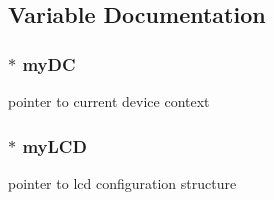 \subsection{Variable Documentation}
\hypertarget{group__ap7000__lcd_gba0cd39ac57537de654bae9fd5bab786}{
\subsubsection[{myDC}]{$\ast$ {\bf myDC}}}
\label{group__ap7000__lcd_gba0cd39ac57537de654bae9fd5bab786}


pointer to current device context \hypertarget{group__ap7000__lcd_ga3707e3377bafcb6d796ce38a46273c5}{
\subsubsection[{myLCD}]{$\ast$ {\bf myLCD}}}
\label{group__ap7000__lcd_ga3707e3377bafcb6d796ce38a46273c5}


pointer to lcd configuration structure 